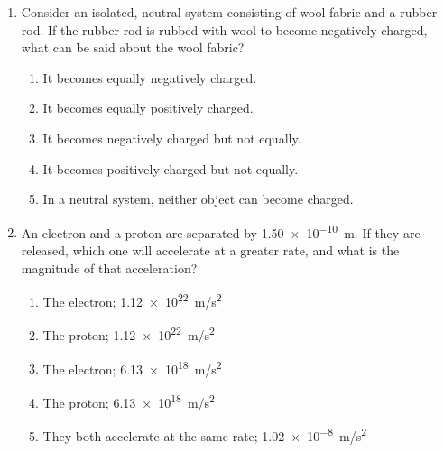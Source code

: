 \documentclass{../../oss-apphys}
\begin{document}
\begin{multicols}{2}
\begin{enumerate}[leftmargin=18pt]
    \columnbreak
    
  \item Consider an isolated, neutral system consisting of wool fabric and a
    rubber rod. If the rubber rod is rubbed with wool to become negatively
    charged, what can be said about the wool fabric?
    \begin{enumerate}[noitemsep,topsep=0pt,leftmargin=18pt,label=(\Alph*)]
    \item It becomes equally negatively charged.
    \item It becomes equally positively charged.
    \item It becomes negatively charged but not equally.
    \item It becomes positively charged but not equally.
    \item In a neutral system, neither object can become charged.
    \end{enumerate}

  \item An electron and a proton are separated by \SI{1.50e-10}{m}. If they are
    released, which one will accelerate at a greater rate, and what is the
    magnitude of that acceleration?
    \begin{enumerate}[noitemsep,topsep=0pt,leftmargin=18pt,label=(\Alph*)]
    \item The electron; \SI{1.12e22}{m/s^2}
    \item The proton; \SI{1.12e22}{m/s^2}
    \item The electron; \SI{6.13e18}{m/s^2}
    \item The proton; \SI{6.13e18}{m/s^2}
    \item They both accelerate at the same rate; \SI{1.02e-8}{m/s^2}
    \end{enumerate}


\end{enumerate}
\end{multicols}
\end{document}
